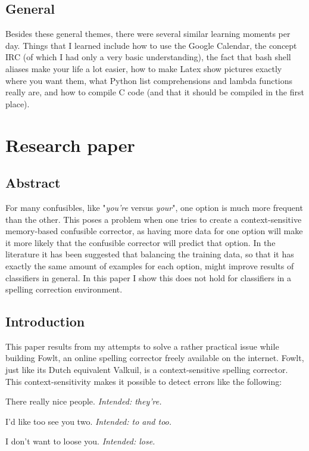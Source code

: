 \documentclass[12pt]{article}
\let\stdsection\section
\renewcommand\section{\newpage\stdsection}
\begin{document}
\subsection{General}

Besides these general themes, there were several similar learning moments per day. Things that I learned include how to use the Google Calendar, the concept IRC (of which I had only a very basic understanding), the fact that bash shell aliases make your life a lot easier, how to make Latex show pictures exactly where you want them, what Python list comprehensions and lambda functions really are, and how to compile C code (and that it should be compiled in the first place).

\section{Research paper}

\subsection*{Abstract}

For many confusibles, like "\emph{you're} versus \emph{your}", one option is much more frequent than the other. This poses a problem when one tries to create a context-sensitive memory-based confusible corrector, as having more data for one option will make it more likely that the confusible corrector will predict that option. In the literature it has been suggested that balancing the training data, so that it has exactly the same amount of examples for each option, might improve results of classifiers in general. In this paper I show this does not hold for classifiers in a spelling correction environment.

\subsection{Introduction}

This paper results from my attempts to solve a rather practical issue while building Fowlt, an online spelling corrector freely available on the internet. Fowlt, just like its Dutch equivalent Valkuil, is a context-sensitive spelling corrector. This context-sensitivity makes it possible to detect errors like the following:

\begin{examples}

\item There really nice people. \emph{Intended: they're.}
\item I'd like too see you two. \emph{Intended: to and too.}
\item I don't want to loose you. \emph{Intended: lose.}

\end{examples}
\end{document}
